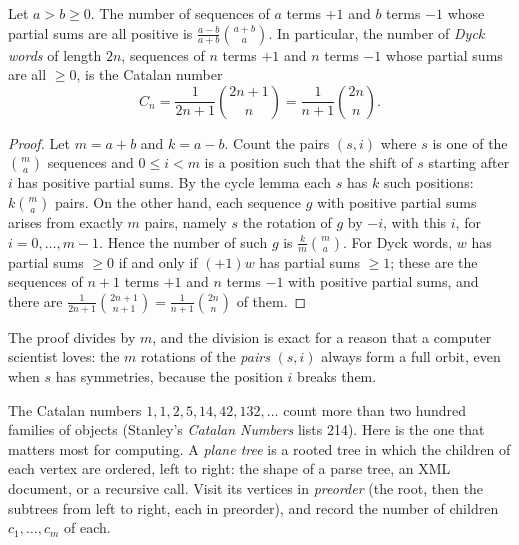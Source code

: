 \begin{corollary}\label{cor:ballot}
Let $a>b\ge0$. The number of sequences of $a$ terms $+1$ and $b$ terms $-1$ whose partial sums are all positive is
$\frac{a-b}{a+b}\binom{a+b}a$. In particular, the number of \emph{Dyck words} of length $2n$, sequences of $n$ terms $+1$ and $n$ terms $-1$
whose partial sums are all $\ge0$, is the Catalan number
\[
C_n=\frac1{2n+1}\binom{2n+1}n=\frac1{n+1}\binom{2n}n .
\]
\end{corollary}
\begin{proof}
Let $m=a+b$ and $k=a-b$. Count the pairs $(s,i)$ where $s$ is one of the $\binom ma$ sequences and $0\le i<m$ is a position such that the
shift of $s$ starting after $i$ has positive partial sums. By the cycle lemma each $s$ has $k$ such positions: $k\binom ma$ pairs. On the
other hand, each sequence $g$ with positive partial sums arises from exactly $m$ pairs, namely $s$ the rotation of $g$ by $-i$, with this
$i$, for $i=0,\dots,m-1$. Hence the number of such $g$ is $\frac km\binom ma$. For Dyck words, $w$ has partial sums $\ge0$ if and only if $(+1)w$ has
partial sums $\ge1$; these are the sequences of $n+1$ terms $+1$ and $n$ terms $-1$ with positive partial sums, and there are
$\frac1{2n+1}\binom{2n+1}{n+1}=\frac1{n+1}\binom{2n}n$ of them.
\end{proof}

The proof divides by $m$, and the division is exact for a reason that a computer scientist loves: the $m$ rotations of the
\emph{pairs} $(s,i)$ always form a full orbit, even when $s$ has symmetries, because the position $i$ breaks them.

The Catalan numbers $1,1,2,5,14,42,132,\dots$ count more than two hundred families of objects (Stanley's \emph{Catalan Numbers}
lists 214). Here is the one that matters most for computing. A \emph{plane tree} is a rooted tree in which the children of each vertex
are ordered, left to right: the shape of a parse tree, an XML document, or a recursive call. Visit its vertices in \emph{preorder}
(the root, then the subtrees from left to right, each in preorder), and record the number of children $c_1,\dots,c_m$ of each.

